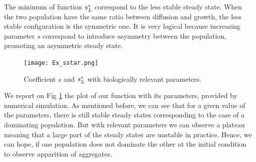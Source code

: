 The minimum of function ${s^{*}_{L}}$ correspond to the less stable steady state. When the two population have the same ratio between diffusion and growth, the less stable configuration is the symmetric one. It is very logical because increasing parameter $s$ correspond to introduce asymmetry between the population, promoting an asymmetric steady state.

\begin{figure}
	\texttt{[image: Ex\_sstar.png]}
	\caption{Coefficient $s$ and ${s^{*}_{L}}$ with biologically relevant parameters.}
	\label{Ex_sstar}
\end{figure}

We report on Fig \ref{Ex_sstar} the plot of our function with its parameters, provided by numerical simulation. As mentioned before, we can see that for a given value of the parameters, there is still stable steady states corresponding to the case of a dominating population. But with relevant parameters we can observe a plateau meaning that a large part of the steady states are unstable in practice. Hence, we can hope, if one population does not dominate the other at the initial condition to observe apparition of aggregates.

%

